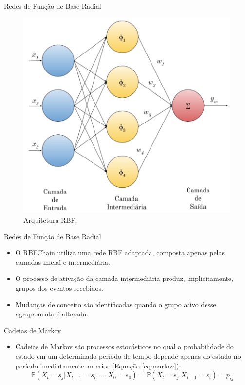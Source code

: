\documentclass[10pt]{beamer}
\begin{document}
\begin{frame}{Redes de Função de Base Radial}
    \begin{figure}[H]
    \begin{center}
        \includegraphics[scale=0.63]{imagens/rbf_arq.png}
        \caption{Arquitetura RBF.}
        \label{fig:rbg_arq}
    \end{center}
    \end{figure}
\end{frame}

\begin{frame}{Redes de Função de Base Radial}
    \begin{itemize}
        \item<1 -> O RBFChain utiliza uma rede RBF adaptada, composta apenas pelas camadas inicial e intermediária.
        \item<1 -> O processo de ativação da camada intermediária produz, implicitamente, grupos dos eventos recebidos.
        \item<1 -> Mudanças de conceito são identificadas quando o grupo ativo desse agrupamento é alterado.
      \end{itemize}
\end{frame}

\begin{frame}{Cadeias de Markov}
    \begin{itemize}
        \item<1 -> \alert{Cadeias de Markov} são processos estocásticos no qual a probabilidade do estado em um determinado período de tempo depende apenas do estado no período imediatamente anterior (Equação \ref{eq:markov}).
        \begin{equation}
            \label{eq:markov}
            \mathbb { P } \left( X _ { t } = s _ { j } | X _ { t - 1 } = s _ { i } , \ldots , X _ { 0 } = s _ { 0 } \right) = \mathbb { P } \left( X _ { t } = s _ { j } | X _ { t - 1 } = s _ { i } \right) = p _ { i j }
        \end{equation}
      \end{itemize}
\end{frame}
\end{document}
